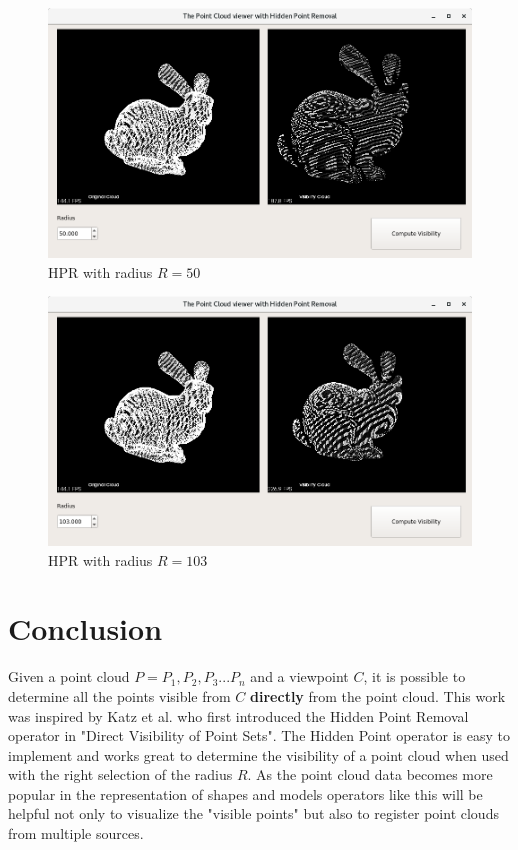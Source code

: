 \documentclass[11pt]{article}
\begin{document}
\begin{figure}[h]
\includegraphics[width=12cm]{bunny-looking-back-50}
\centering
\caption{HPR with radius $R = 50$}
\label{fig:bunny-looking-back-50}
\end{figure}

\begin{figure}[h]
\includegraphics[width=12cm]{bunny-looking-back-103}
\centering
\caption{HPR with radius $R = 103$}
\label{fig:bunny-looking-back-103}
\end{figure}

\pagebreak

\section{Conclusion}
Given a point cloud $ P = P_{1},P_{2},P_{3} ... P_{n} $ and a viewpoint $ C $, it is possible to determine all the points visible from $ C $ \textbf{directly} from the point cloud. This work was inspired by Katz et al. \cite{Katz07} who first introduced the Hidden Point Removal operator in "Direct Visibility of Point Sets". The Hidden Point operator is easy to implement and works great to determine the visibility of a point cloud when used with the right selection of the radius $R$. As the point cloud data becomes more popular in the representation of shapes and models operators like this will be helpful not only to visualize the "visible points" but also to register point clouds from multiple sources. 
\end{document}
